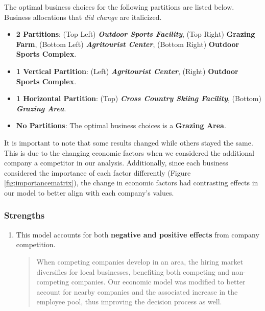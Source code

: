 \documentclass{mcmthesis}
\begin{document}
The optimal business choices for the following partitions are listed below. Business allocations that \textit{did change} are italicized. 
\begin{itemize}
    \item \textbf{2 Partitions}: (Top Left) \textbf{\textit{Outdoor Sports Facility}}, (Top Right) \textbf{Grazing Farm}, (Bottom Left) \textbf{\textit{Agritourist Center}}, (Bottom Right) \textbf{Outdoor Sports Complex}.
    \item \textbf{1 Vertical Partition}: (Left) \textbf{\textit{Agritourist Center}}, (Right) \textbf{Outdoor Sports Complex}.
    \item \textbf{1 Horizontal Partition}: (Top) \textbf{\textit{Cross Country Skiing Facility}}, (Bottom) \textbf{\textit{Grazing Area}}.
    \item \textbf{No Partitions}: The optimal business choices is a \textbf{Grazing Area}.
\end{itemize}

It is important to note that some results changed while others stayed the same. This is due to the changing economic factors when we considered the additional company a competitor in our analysis. Additionally, since each business considered the importance of each factor differently (Figure \ref{fig:importancematrix}), the change in economic factors had contrasting effects in our model to better align with each company's values.

\subsubsection{Strengths}

\begin{enumerate} 
   \item This model accounts for both \textbf{negative and positive effects} from company competition.
    \begin{quote}
    When competing companies develop in an area, the hiring market diversifies for local businesses, benefiting both competing and non-competing companies. Our economic model was modified to better account for nearby companies and the associated increase in the employee pool, thus improving the decision process as well. 
    \end{quote}
\end{enumerate}
\end{document}
